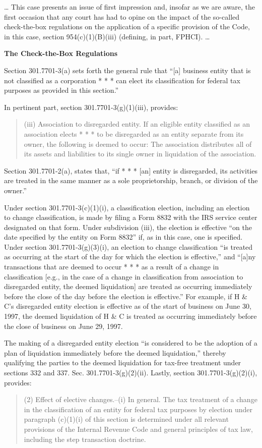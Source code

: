 \begin{select}
\ldots
This case presents an issue of first impression and, insofar as we are aware, the first occasion that any court has had to opine
on the impact of the so-called check-the-box regulations on the application of a specific provision of the Code, in this case,
section 954(c)(1)(B)(iii) (defining, in part, FPHCI).
\ldots
\begin{center}\textbf{The Check-the-Box Regulations}\\
\end{center}
Section 301.7701-3(a) sets forth the general rule that ``[a] business entity that is not classified as a corporation * * * can elect
its classification for federal tax purposes as provided in this section.''

In pertinent part, section 301.7701-3(g)(1)(iii), provides:
\begin{quote}(iii) Association to disregarded entity. If an eligible entity classified as an association elects * * * to be disregarded as an
entity separate from its owner, the following is deemed to occur: The association distributes all of its assets and liabilities to
its single owner in liquidation of the association.
\end{quote}
Section 301.7701-2(a), states that, ``if * * * [an] entity is disregarded, its activities are treated in the same manner as a sole proprietorship, branch, or division of the owner.''

Under section 301.7701-3(c)(1)(i), a classification election, including an election to change classification, is made by filing a
Form 8832 with the IRS service center designated on that form. Under subdivision (iii), the election is effective ``on the date
specified by the entity on Form 8832'' if, as in this case, one is specified.
Under section 301.7701-3(g)(3)(i), an election to change classification ``is treated as occurring at the start of the day for which the election is effective,'' and ``[a]ny transactions that are deemed to occur * * * as a result of a change in classification [e.g., in the case of a change in classification from association to disregarded entity, the deemed liquidation] are treated as occurring immediately before the close of the day before the election is effective.'' For example, if H \& C's disregarded entity election is effective as of the start of business on June 30, 1997, the deemed liquidation of H \& C is treated as occurring immediately before the close of business on June 29, 1997.

The making of a disregarded entity election ``is considered to be the adoption of a plan of liquidation immediately before the
deemed liquidation,'' thereby qualifying the parties to the deemed liquidation for tax-free treatment under sections 332 and
337. Sec. 301.7701-3(g)(2)(ii).
Lastly, section 301.7701-3(g)(2)(i), provides:
\begin{quote}(2) Effect of elective changes.--(i) In general. The tax treatment of a change in the classification of an entity for federal tax
purposes by election under paragraph (c)(1)(i) of this section is determined under all relevant provisions of the Internal
Revenue Code and general principles of tax law, including the step transaction doctrine.
\end{quote}


\end{select}
